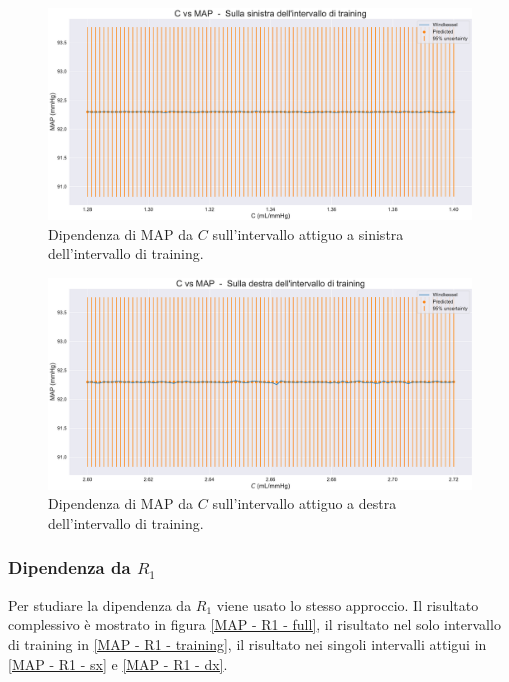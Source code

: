 \begin{figure}
    \centering
    \includegraphics[width=1\textwidth]{images/Training (risultati)/MAP/MAP - C - sx.pdf}
    \caption{Dipendenza di MAP da $C$ sull'intervallo attiguo a sinistra dell'intervallo di training.}
    \label{MAP - C - sx}
\end{figure}



\begin{figure}
    \centering
    \includegraphics[width=1\textwidth]{images/Training (risultati)/MAP/MAP - C - dx.pdf}
    \caption{Dipendenza di MAP da $C$ sull'intervallo attiguo a destra dell'intervallo di training.}
    \label{MAP - C - dx}
\end{figure}




\newpage
\subsubsection{Dipendenza da $R_1$}
Per studiare la dipendenza da $R_1$ viene usato lo stesso approccio. Il risultato complessivo è mostrato in figura \ref{MAP - R1 - full}, il risultato nel solo intervallo di training in \ref{MAP - R1 - training}, il risultato nei singoli intervalli attigui in \ref{MAP - R1 - sx} e \ref{MAP - R1 - dx}.

